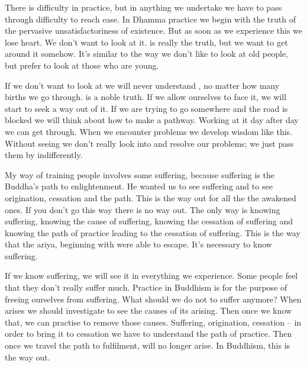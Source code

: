 There is difficulty in practice, but in anything we undertake we have to pass through difficulty to reach ease. In Dhamma practice we begin with the truth of  the pervasive unsatisfactoriness of existence. But as soon as we experience this we lose heart. We don't want to look at it.  is really the truth, but we want to get around it somehow. It's similar to the way we don't like to look at old people, but prefer to look at those who are young.

If we don't want to look at  we will never understand , no matter how many births we go through.  is a noble truth. If we allow ourselves to face it, we will start to seek a way out of it. If we are trying to go somewhere and the road is blocked we will think about how to make a pathway. Working at it day after day we can get through. When we encounter problems we develop wisdom like this. Without seeing  we don't really look into and resolve our problems; we just pass them by indifferently.

My way of training people involves some suffering, because suffering is the Buddha's path to enlightenment. He wanted us to see suffering and to see origination, cessation and the path. This is the way out for all the  the awakened ones. If you don't go this way there is no way out. The only way is knowing suffering, knowing the cause of suffering, knowing the cessation of suffering and knowing the path of practice leading to the cessation of suffering. This is the way that the ariya, beginning with  were able to escape. It's necessary to know suffering.

If we know suffering, we will see it in everything we experience. Some people feel that they don't really suffer much. Practice in Buddhism is for the purpose of freeing ourselves from suffering. What should we do not to suffer anymore? When  arises we should investigate to see the causes of its arising. Then once we know that, we can practise to remove those causes. Suffering, origination, cessation -- in order to bring it to cessation we have to understand the path of practice. Then once we travel the path to fulfilment,  will no longer arise. In Buddhism, this is the way out.

